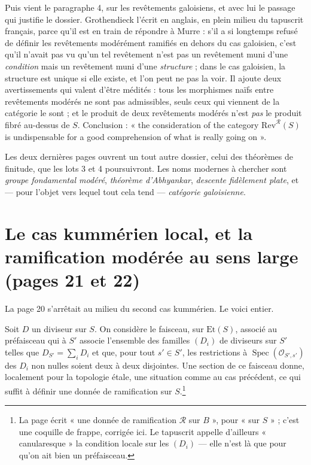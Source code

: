 \documentclass[11pt,a4paper]{article}
\begin{document}
\begin{resume}
Puis vient le paragraphe 4, sur les revêtements galoisiens, et avec lui le
passage qui justifie le dossier. Grothendieck l'écrit en anglais, en plein
milieu du tapuscrit français, parce qu'il est en train de répondre à Murre :
s'il a si longtemps refusé de définir les revêtements modérément ramifiés en
dehors du cas galoisien, c'est qu'il n'avait pas vu qu'un tel revêtement n'est
pas un revêtement muni d'une \emph{condition} mais un revêtement muni d'une
\emph{structure} ; dans le cas galoisien, la structure est unique si elle
existe, et l'on peut ne pas la voir. Il ajoute deux avertissements qui valent
d'être médités : tous les morphismes naïfs entre revêtements modérés ne sont
pas admissibles, seuls ceux qui viennent de la catégorie le sont ; et le
produit de deux revêtements modérés n'est \emph{pas} le produit fibré
au-dessus de $S$. Conclusion : « the consideration of the category
$\mathrm{Rev}^{\mathcal{R}}(S)$ is undispensable for a good comprehension of
what is really going on ».

Les deux dernières pages ouvrent un tout autre dossier, celui des théorèmes de
finitude, que les lots 3 et 4 poursuivront. Les noms modernes à chercher sont
\emph{groupe fondamental modéré}, \emph{théorème d'Abhyankar}, \emph{descente
fidèlement plate}, et --- pour l'objet vers lequel tout cela tend ---
\emph{catégorie galoisienne}.

\end{resume}

\section*{Le cas kummérien local, et la ramification modérée au sens large (pages 21 et 22)}

La page 20 s'arrêtait au milieu du second cas kummérien. Le voici entier.

Soit $D$ un diviseur sur $S$. On considère le faisceau, sur $\mathrm{Et}(S)$,
associé au préfaisceau qui à $S'$ associe l'ensemble des familles $(D_{i})$ de
diviseurs sur $S'$ telles que $D_{S'} = \sum_{i} D_{i}$ et que, pour tout
$s' \in S'$, les restrictions à $\operatorname{Spec}(\mathcal{O}_{S',s'})$ des
$D_{i}$ non nulles soient deux à deux disjointes. Une section de ce faisceau
donne, localement pour la topologie étale, une situation comme au cas
précédent, ce qui suffit à définir une donnée de ramification sur
$S$.\footnote{La page écrit « une donnée de ramification $\mathcal{R}$ sur
$B$ », pour « sur $S$ » ; c'est une coquille de frappe, corrigée ici. Le
tapuscrit appelle d'ailleurs « canularesque » la condition locale sur les
$(D_{i})$ --- elle n'est là que pour qu'on ait bien un préfaisceau.}
\end{document}
